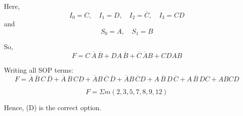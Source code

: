 \documentclass{article}
\begin{document}
Here, \[
I_0 = C, \quad I_1 = D, \quad I_2 = \overline{C}, \quad I_3 = CD
\]
and \[
S_0 = A, \quad S_1 = B
\]

So,
\[
F = C \, \overline{A} \, \overline{B} + D A \, \overline{B} + \overline{C} \, \overline{A} B + CD A B
\]

Writing all SOP terms:
\[
F = \overline{A} \, \overline{B} \, C \, \overline{D} 
+ \overline{A} \, \overline{B} \, C D 
+ \overline{A} B \, \overline{C} \, \overline{D} 
+ \overline{A} B \, \overline{C} D 
+ A \, \overline{B} \, D \, \overline{C} 
+ A \, \overline{B} \, D C 
+ A B C D
\]

\[
F = \Sigma m(2, 3, 5, 7, 8, 9, 12)
\]

Hence, (D) is the correct option.
\end{document}
